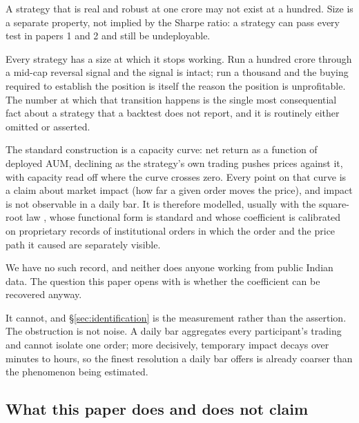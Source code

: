 \documentclass[11pt,a4paper]{article}
\begin{document}
\begin{finding}
A strategy that is real and robust at one crore may not exist at a hundred. Size is a separate
property, not implied by the Sharpe ratio: a strategy can pass every test in papers 1 and 2 and
still be undeployable.
\end{finding}

Every strategy has a size at which it stops working. Run a hundred crore through a mid-cap reversal
signal and the signal is intact; run a thousand and the buying required to establish the position is
itself the reason the position is unprofitable. The number at which that transition happens is the
single most consequential fact about a strategy that a backtest does not report, and it is routinely
either omitted or asserted.

The standard construction is a capacity curve: net return as a function of deployed AUM, declining
as the strategy's own trading pushes prices against it, with capacity read off where the curve
crosses zero. Every point on that curve is a claim about market impact (how far a given order moves
the price), and impact is not observable in a daily bar. It is therefore modelled, usually with the
square-root law \citep{almgren2005}, whose functional form is standard and whose coefficient is
calibrated on proprietary records of institutional orders in which the order and the price path it
caused are separately visible.

We have no such record, and neither does anyone working from public Indian data. The question this
paper opens with is whether the coefficient can be recovered anyway.

\begin{finding}
It cannot, and \S\ref{sec:identification} is the measurement rather than the assertion. The
obstruction is not noise. A daily bar aggregates every participant's trading and cannot isolate one
order; more decisively, temporary impact decays over minutes to hours, so the finest resolution a
daily bar offers is already coarser than the phenomenon being estimated.
\end{finding}

\subsection{What this paper does and does not claim}
\end{document}

